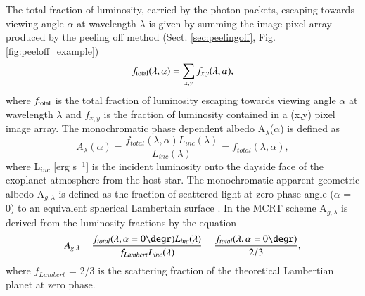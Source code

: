 \documentclass{aa}
\begin{document}
The total fraction of luminosity, carried by the photon packets, escaping towards viewing angle $\alpha$ at wavelength $\lambda$ is given by summing the image pixel array produced by the peeling off method (Sect. \ref{sec:peelingoff}, Fig. \ref{fig:peeloff_example})
\begin{equation}
f_{\rm total}(\lambda, \alpha) = \sum_{x,y} f_{x,y}(\lambda, \alpha),
\end{equation}
where $f_{\rm total}$ is the total fraction of luminosity escaping towards viewing angle $\alpha$ at wavelength $\lambda$ and $f_{x,y}$ is the fraction of luminosity contained in a (x,y) pixel image array.
The monochromatic phase dependent albedo A$_{\lambda}$($\alpha$) is defined as
\begin{equation}
\label{eq:albspec}
A_{\lambda}(\alpha) = \frac{f_{total}(\lambda, \alpha) L_{inc}(\lambda)}{L_{inc}(\lambda)} = f_{total}(\lambda, \alpha), 
\end{equation}
where L$_{inc}$ [erg s$^{-1}$] is the incident luminosity onto the dayside face of the exoplanet atmosphere from the host star. 
The monochromatic apparent geometric albedo A$_{g, \lambda}$ is defined as the fraction of scattered light at zero phase angle ($\alpha$ = 0\degr) to an equivalent spherical Lambertain surface \citep[e.g..][]{Seager2010,Madhusudhan2012}.
In the MCRT scheme A$_{g,\lambda}$ is derived from the luminosity fractions by the equation
\begin{equation}
\label{eq:geoalb}
A_{g,\lambda} = \frac{f_{total}(\lambda, \alpha = 0\degr)L_{inc}(\lambda)}{f_{Lambert}L_{inc}(\lambda)} = \frac{f_{total}(\lambda, \alpha = 0\degr)}{2/3},
\end{equation}
where $f_{Lambert}$ = 2/3 is the scattering fraction of the theoretical Lambertian planet at zero phase.
\end{document}
